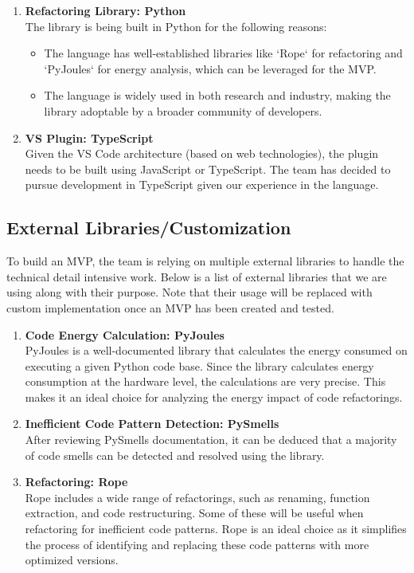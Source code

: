 \documentclass{article}
\begin{document}
\begin{enumerate}
    \item \textbf{Refactoring Library: Python}\\
    The library is being built in Python for the following reasons:
    \begin{itemize}
        \item The language has well-established libraries like `Rope` for refactoring and `PyJoules` for energy analysis, which can be leveraged for the MVP.
        \item The language is widely used in both research and industry, making the library adoptable by a broader community of developers.
    \end{itemize}
    \item \textbf{VS Plugin: TypeScript}\\
    Given the VS Code architecture (based on web technologies), the plugin needs to be built using JavaScript or TypeScript. The team has decided to pursue development in TypeScript given our experience in the language.
\end{enumerate}

\subsection{External Libraries/Customization}
To build an MVP, the team is relying on multiple external libraries to handle the technical detail intensive work. Below is a list of external libraries that we are using along with their purpose. Note that their usage will be replaced with custom implementation once an MVP has been created and tested.

\begin{enumerate}
    \item \textbf{Code Energy Calculation: PyJoules}\\
    PyJoules is a well-documented library that calculates the energy consumed on executing a given Python code base. Since the library calculates energy consumption at the hardware level, the calculations are very precise. This makes it an ideal choice for analyzing the energy impact of code refactorings.

    \item \textbf{Inefficient Code Pattern Detection: PySmells}\\
    After reviewing PySmells documentation, it can be deduced that a majority of code smells can be detected and resolved using the library.

    \item \textbf{Refactoring: Rope}\\
    Rope includes a wide range of refactorings, such as renaming, function extraction, and code restructuring. Some of these will be useful when refactoring for inefficient code patterns. Rope is an ideal choice as it simplifies the process of identifying and replacing these code patterns with more optimized versions.
\end{enumerate}
\end{document}
